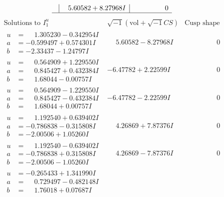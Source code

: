 \documentclass[1p]{elsarticle_modified}
\theoremstyle{definition}
\newcommand{\I}{\sqrt{-1}}
\begin{document}
$$\begin{array}{c|c|c}
 & \phantom{-}5.60582 + 8.27968 I & \phantom{-0.000000 } 0\\
 \hline 
 \end{array}$$\newpage$$\begin{array}{c|c|c}  
\text{Solutions to }I^u_{1}& \I (\text{vol} + \sqrt{-1}CS) & \text{Cusp shape}\\
 \hline 
\begin{aligned}
u &= \phantom{-}1.305230 - 0.342954 I \\
a &= -0.599497 + 0.574301 I \\
b &= -2.33437 - 1.24797 I\end{aligned}
 & \phantom{-}5.60582 - 8.27968 I & \phantom{-0.000000 } 0 \\ \hline\begin{aligned}
u &= \phantom{-}0.564909 + 1.229550 I \\
a &= \phantom{-}0.845427 + 0.432384 I \\
b &= \phantom{-}1.68044 - 0.00757 I\end{aligned}
 & -6.47782 + 2.22599 I & \phantom{-0.000000 } 0 \\ \hline\begin{aligned}
u &= \phantom{-}0.564909 - 1.229550 I \\
a &= \phantom{-}0.845427 - 0.432384 I \\
b &= \phantom{-}1.68044 + 0.00757 I\end{aligned}
 & -6.47782 - 2.22599 I & \phantom{-0.000000 } 0 \\ \hline\begin{aligned}
u &= \phantom{-}1.192540 + 0.639402 I \\
a &= -0.786838 - 0.315808 I \\
b &= -2.00506 + 1.05260 I\end{aligned}
 & \phantom{-}4.26869 + 7.87376 I & \phantom{-0.000000 } 0 \\ \hline\begin{aligned}
u &= \phantom{-}1.192540 - 0.639402 I \\
a &= -0.786838 + 0.315808 I \\
b &= -2.00506 - 1.05260 I\end{aligned}
 & \phantom{-}4.26869 - 7.87376 I & \phantom{-0.000000 } 0 \\ \hline\begin{aligned}
u &= -0.265433 + 1.341990 I \\
a &= \phantom{-}0.729497 - 0.482148 I \\
b &= \phantom{-}1.76018 + 0.07687 I\end{aligned}

\end{array}$$
\end{document}

